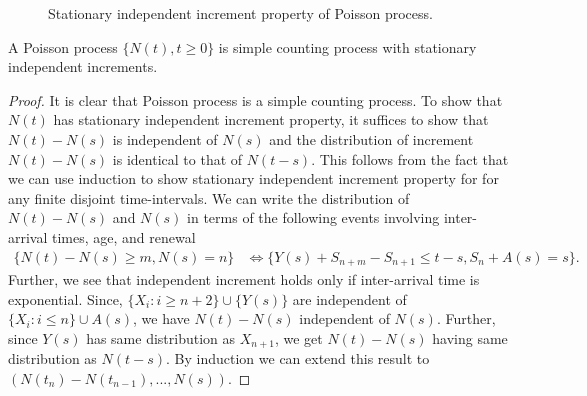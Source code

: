 \documentclass[a4paper,10pt,english]{article}
\begin{document}
\begin{figure}[hhhh]
\center
	
  	\caption{Stationary independent increment property of Poisson process.}
	\label{Fig:IndependentIncrements}
\end{figure}

\begin{prop} A Poisson process $\{N(t), t\geqslant 0\}$ is simple counting process with stationary independent increments.
\end{prop}
\begin{proof}
It is clear that Poisson process is a simple counting process. 
To show that $N(t)$ has stationary independent increment property, it suffices to show that $N(t)-N(s)$ is independent of $N(s)$ and the distribution of increment $N(t) - N(s)$ is identical to that of $N(t-s)$. 
This follows from the fact that we can use induction to show stationary independent increment property for for any finite disjoint time-intervals.
We can write the distribution of $N(t)-N(s)$ and $N(s)$ in terms of the following events involving inter-arrival times, age, and renewal
\begin{align*}
\{ N(t) - N(s) \geqslant m, N(s) = n \} &\iff \{ Y(s) + S_{n+m} - S_{n+1} \leqslant t - s, S_n + A(s) = s \}.
\end{align*}
Further, we see that independent increment holds only if inter-arrival time is exponential. 
Since, $\{X_i: i \geqslant n+2\}\cup\{Y(s)\}$ are independent of $\{X_i: i \leqslant n\}\cup{A(s)}$, we have $N(t)-N(s)$ independent of $N(s)$. 
Further, since $Y(s)$ has same distribution as $X_{n+1}$, we get $N(t) - N(s)$ having same distribution as $N(t-s)$. 
By induction we can extend this result to $(N(t_{n})-N(t_{n-1}),...,N(s))$. 
\end{proof}
\end{document}
